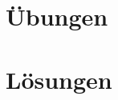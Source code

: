 \documentclass[11pt]{article}
\begin{document}
\pagestyle{fancy}
\section*{Übungen}

\setcounter{equation}{0}
\newpage

\section*{Lösungen}

\end{document}
